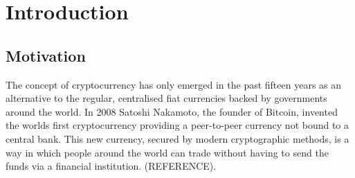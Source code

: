 \documentclass{l4proj}
\begin{document}
%
%
%
%
%
%
%
%
\chapter{Introduction}


\section{Motivation}

The concept of cryptocurrency has only emerged in the past fifteen years as an alternative to the regular,
centralised fiat currencies backed by governments around the world. In 2008 Satoshi Nakamoto, the 
founder of Bitcoin, invented the worlds first cryptocurrency providing a peer-to-peer currency
not bound to a central bank. This new currency, secured by modern cryptographic methods, is a way in
which people around the world can trade without having to send the funds via a financial institution. (REFERENCE).
\end{document}
